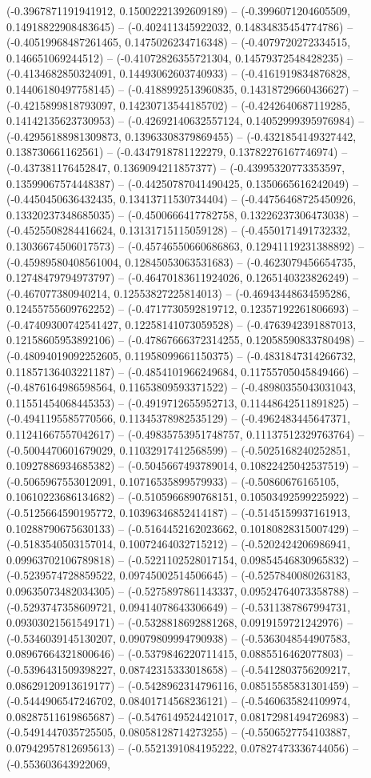 (-0.3967871191941912, 0.15002221392609189) -- (-0.3996071204605509, 0.14918822908483645) -- (-0.402411345922032, 0.14834835454774786) -- (-0.40519968487261465, 0.1475026234716348) -- (-0.4079720272334515, 0.146651069244512) -- (-0.41072826355721304, 0.14579372548428235) -- (-0.4134682850324091, 0.14493062603740933) -- (-0.4161919834876828, 0.14406180497758145) -- (-0.4188992513960835, 0.14318729660436627) -- (-0.4215899818793097, 0.14230713544185702) -- (-0.4242640687119285, 0.14142135623730953) -- (-0.42692140632557124, 0.14052999395976984) -- (-0.42956188981309873, 0.13963308379869455) -- (-0.4321854149327442, 0.138730661162561) -- (-0.4347918781122279, 0.13782276167746974) -- (-0.437381176452847, 0.1369094211857377) -- (-0.43995320773353597, 0.13599067574448387) -- (-0.44250787041490425, 0.1350665616242049) -- (-0.4450450636432435, 0.13413711530734404) -- (-0.44756468725450926, 0.13320237348685035) -- (-0.4500666417782758, 0.13226237306473038) -- (-0.4525508284416624, 0.13131715115059128) -- (-0.4550171491732332, 0.13036674506017573) -- (-0.45746550660686863, 0.12941119231388892) -- (-0.45989580408561004, 0.12845053063531683) -- (-0.4623079456654735, 0.12748479794973797) -- (-0.46470183611924026, 0.1265140323826249) -- (-0.467077380940214, 0.12553827225814013) -- (-0.46943448634595286, 0.12455755609762252) -- (-0.4717730592819712, 0.12357192261806693) -- (-0.47409300742541427, 0.12258141073059528) -- (-0.4763942391887013, 0.12158605953892106) -- (-0.47867666372314255, 0.12058590833780498) -- (-0.48094019092252605, 0.11958099661150375) -- (-0.4831847314266732, 0.11857136403221187) -- (-0.4854101966249684, 0.11755705045849466) -- (-0.4876164986598564, 0.11653809593371522) -- (-0.48980355043031043, 0.11551454068445353) -- (-0.4919712655952713, 0.11448642511891825) -- (-0.4941195585770566, 0.11345378982535129) -- (-0.4962483445647371, 0.11241667557042617) -- (-0.49835753951748757, 0.11137512329763764) -- (-0.5004470601679029, 0.11032917412568599) -- (-0.5025168240252851, 0.10927886934685382) -- (-0.5045667493789014, 0.10822425042537519) -- (-0.5065967553012091, 0.10716535899579933) -- (-0.50860676165105, 0.10610223686134682) -- (-0.5105966890768151, 0.10503492599225922) -- (-0.5125664590195772, 0.10396346852414187) -- (-0.5145159937161913, 0.10288790675630133) -- (-0.5164452162023662, 0.10180828315007429) -- (-0.5183540503157014, 0.10072464032715212) -- (-0.5202424206986941, 0.09963702106789818) -- (-0.5221102528017154, 0.09854546830965832) -- (-0.5239574728859522, 0.09745002514506645) -- (-0.5257840080263183, 0.09635073482034305) -- (-0.5275897861143337, 0.09524764073358788) -- (-0.5293747358609721, 0.09414078643306649) -- (-0.5311387867994731, 0.09303021561549171) -- (-0.5328818692881268, 0.0919159721242976) -- (-0.5346039145130207, 0.09079809994790938) -- (-0.5363048544907583, 0.08967664321800646) -- (-0.5379846220711415, 0.0885516462077803) -- (-0.5396431509398227, 0.08742315333018658) -- (-0.5412803756209217, 0.08629120913619177) -- (-0.5428962314796116, 0.08515585831301459) -- (-0.5444906547246702, 0.08401714568236121) -- (-0.5460635824109974, 0.08287511619865687) -- (-0.5476149524421017, 0.08172981494726983) -- (-0.5491447035725505, 0.08058128714273255) -- (-0.5506527754103887, 0.07942957812695613) -- (-0.5521391084195222, 0.07827473336744056) -- (-0.553603643922069, 